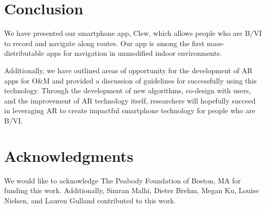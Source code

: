 \documentclass[chi]{sigchi}
\newcommand{\BVI}{B/VI\xspace}
\newcommand{\OM}{O\&M\xspace}
\begin{document}
\section{Conclusion}
We have presented our smartphone app, Clew, which allows people who are \BVI to record and navigate along routes.  Our app is among the first mass-distributable apps for navigation in unmodified indoor environments.%

Additionally, we have outlined areas of opportunity for the development of AR apps for \OM and provided a discussion of guidelines for successfully using this technology.  Through the development of new algorithms, co-design with users, and the improvement of AR technology itself, researchers will hopefully succeed in leveraging AR to create impactful smartphone technology for people who are \BVI.  
%
\section{Acknowledgments}
We would like to acknowledge The Peabody Foundation of Boston, MA for funding this work.  Additionally, Simran Malhi, Dieter Brehm, Megan Ku, Louise Nielsen, and Lauren Gulland contributed to this work.
\balance{}



\end{document}
